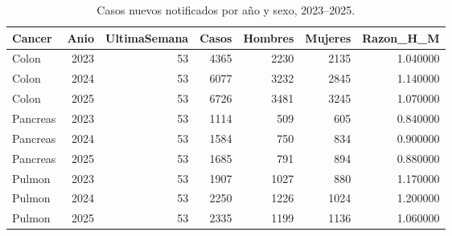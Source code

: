 \begin{table}
\caption{Casos nuevos notificados por año y sexo, 2023--2025.}
\label{tab:boletin_anual}
\begin{tabular}{lrrrrrr}
\toprule
Cancer & Anio & UltimaSemana & Casos & Hombres & Mujeres & Razon_H_M \\
\midrule
Colon & 2023 & 53 & 4365 & 2230 & 2135 & 1.040000 \\
Colon & 2024 & 53 & 6077 & 3232 & 2845 & 1.140000 \\
Colon & 2025 & 53 & 6726 & 3481 & 3245 & 1.070000 \\
Pancreas & 2023 & 53 & 1114 & 509 & 605 & 0.840000 \\
Pancreas & 2024 & 53 & 1584 & 750 & 834 & 0.900000 \\
Pancreas & 2025 & 53 & 1685 & 791 & 894 & 0.880000 \\
Pulmon & 2023 & 53 & 1907 & 1027 & 880 & 1.170000 \\
Pulmon & 2024 & 53 & 2250 & 1226 & 1024 & 1.200000 \\
Pulmon & 2025 & 53 & 2335 & 1199 & 1136 & 1.060000 \\
\bottomrule
\end{tabular}
\end{table}
